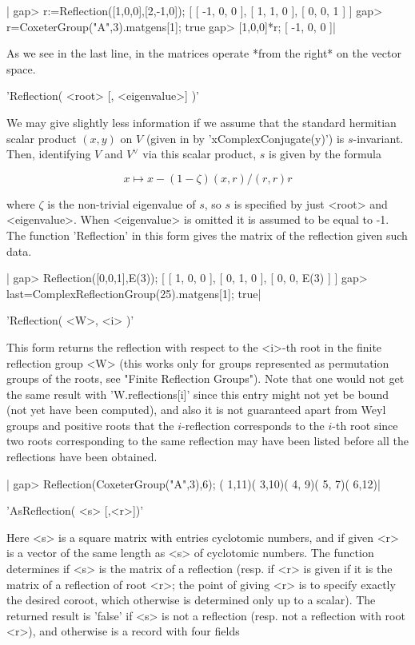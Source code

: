 |    gap> r:=Reflection([1,0,0],[2,-1,0]);
    [ [ -1, 0, 0 ], [ 1, 1, 0 ], [ 0, 0, 1 ] ]
    gap> r=CoxeterGroup("A",3).matgens[1];
    true
    gap> [1,0,0]*r;
    [ -1, 0, 0 ]|

As we see in the last line, in {\GAP} the matrices operate *from the right*
on the vector space.

'Reflection( <root> [, <eigenvalue>] )'

We  may  give   slightly  less  information  if  we   assume  that  the
standard hermitian  scalar product  $(x,y)$ on $V$  (given in  {\GAP} by
'x\*ComplexConjugate(y)') is $s$-invariant.  Then, identifying  $V$ and
$V^\vee$ via this scalar product, $s$ is given by the formula

$$ x\mapsto x-(1-\zeta)(x,r)/(r,r)r$$

where $\zeta$ is the non-trivial eigenvalue of $s$, so $s$ is specified
by just  <root> and  <eigenvalue>. When <eigenvalue>  is omitted  it is
assumed to be equal to -1. The function 'Reflection' in this form gives
the matrix of the reflection given such data.

|    gap> Reflection([0,0,1],E(3));
    [ [ 1, 0, 0 ], [ 0, 1, 0 ], [ 0, 0, E(3) ] ]
    gap> last=ComplexReflectionGroup(25).matgens[1];
    true|

'Reflection( <W>, <i> )'

This  form returns the  reflection with respect  to the <i>-th  root in the
finite  reflection group  <W> (this  works only  for groups  represented as
permutation groups of the roots, see "Finite Reflection Groups"). Note that
one  would not get the same result with 'W.reflections[i]' since this entry
might  not yet be  bound (not yet  have been computed),  and also it is not
guaranteed   apart   from   Weyl   groups   and  positive  roots  that  the
$i$-reflection corresponds to the $i$-th root since two roots corresponding
to the same reflection may have been listed before all the reflections have
been obtained.

|    gap> Reflection(CoxeterGroup("A",3),6);
    ( 1,11)( 3,10)( 4, 9)( 5, 7)( 6,12)|


'AsReflection( <s> [,<r>])'

Here  <s> is a square matrix with  entries cyclotomic numbers, and if given
<r>  is  a  vector  of  the  same  length as <s> of cyclotomic numbers. The
function  determines if <s> is the matrix  of a reflection (resp. if <r> is
given  if it is the matrix of a reflection of root <r>; the point of giving
<r> is to specify exactly the desired coroot, which otherwise is determined
only  up to  a scalar).  The returned  result is  'false' if  <s> is  not a
reflection  (resp.  not  a  reflection  with  root <r>), and otherwise is a
record with four fields \:

